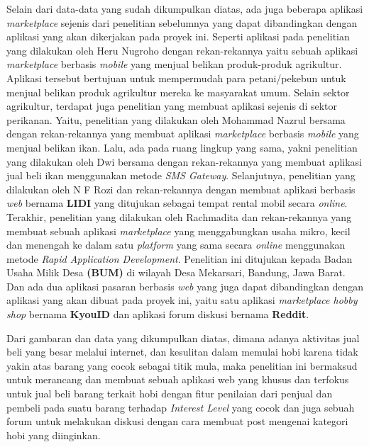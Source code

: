 \documentclass[a4paper]{article}
\begin{document}
Selain dari data-data yang sudah dikumpulkan diatas, ada juga beberapa aplikasi \textit{marketplace} sejenis dari penelitian sebelumnya yang dapat dibandingkan dengan aplikasi yang akan dikerjakan pada proyek ini. Seperti aplikasi pada penelitian yang dilakukan oleh Heru Nugroho dengan rekan-rekannya yaitu sebuah aplikasi \textit{marketplace} berbasis \textit{mobile} yang menjual belikan produk-produk agrikultur. Aplikasi tersebut bertujuan untuk mempermudah para petani/pekebun untuk menjual belikan produk agrikultur mereka ke masyarakat umum\autocite{agriculture-marketplace}. Selain sektor agrikultur, terdapat juga penelitian yang membuat aplikasi sejenis di sektor perikanan. Yaitu, penelitian yang dilakukan oleh Mohammad Nazrul bersama dengan rekan-rekannya yang membuat aplikasi \textit{marketplace} berbasis \textit{mobile} yang menjual belikan ikan\autocite{fishes-marketplace}. Lalu, ada pada ruang lingkup yang sama, yakni penelitian yang dilakukan oleh Dwi bersama dengan rekan-rekannya yang membuat aplikasi jual beli ikan menggunakan metode \textit{SMS Gateway}\autocite{c2c-fish-marketplace}. Selanjutnya, penelitian yang dilakukan oleh N F Rozi dan rekan-rekannya dengan membuat aplikasi berbasis \textit{web} bernama \textbf{LIDI} yang ditujukan sebagai tempat rental mobil secara \textit{online}\autocite{lidi-car-rental}. Terakhir, penelitian yang dilakukan oleh Rachmadita dan rekan-rekannya yang membuat sebuah aplikasi \textit{marketplace} yang menggabungkan usaha mikro, kecil dan menengah ke dalam satu \textit{platform} yang sama secara \textit{online} menggunakan metode \textit{Rapid Application Development}. Penelitian ini ditujukan kepada Badan Usaha Milik Desa \textbf{(BUM)} di wilayah Desa Mekarsari, Bandung, Jawa Barat\autocite{bum-mekarsari}. Dan ada dua aplikasi pasaran berbasis \textit{web} yang juga dapat dibandingkan dengan aplikasi yang akan dibuat pada proyek ini, yaitu satu aplikasi \textit{marketplace hobby shop} bernama \textbf{KyouID} dan aplikasi forum diskusi bernama \textbf{Reddit}.

Dari gambaran dan data yang dikumpulkan diatas, dimana adanya aktivitas jual beli yang besar melalui internet, dan kesulitan dalam memulai hobi karena tidak yakin atas barang yang cocok sebagai titik mula, maka penelitian ini bermaksud untuk merancang dan membuat sebuah aplikasi web yang khusus dan terfokus untuk jual beli barang terkait hobi dengan fitur penilaian dari penjual dan pembeli pada suatu barang terhadap \textit{Interest Level} yang cocok dan juga sebuah forum untuk melakukan diskusi dengan cara membuat post mengenai kategori hobi yang diinginkan.
\end{document}
